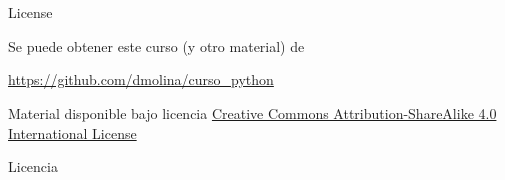 \documentclass[bigger,unknownkeysallowed]{beamer}
\begin{document}
\section{}
\label{sec:org7d57cb8}
\begin{frame}[label={sec:orgd9d09e3}]{License}
\begin{block}{Se puede obtener este curso (y otro material) de}
\begin{center}
\url{https://github.com/dmolina/curso\_python}
\end{center}
\end{block}

\begin{block}{Material disponible bajo licencia}
\href{http://creativecommons.org/licenses/by-sa/4.0/}{Creative Commons Attribution-ShareAlike 4.0 International License}
\end{block}

\begin{exampleblock}{Licencia}
\begin{center}
\end{center}
\end{exampleblock}
\end{frame}
\end{document}
